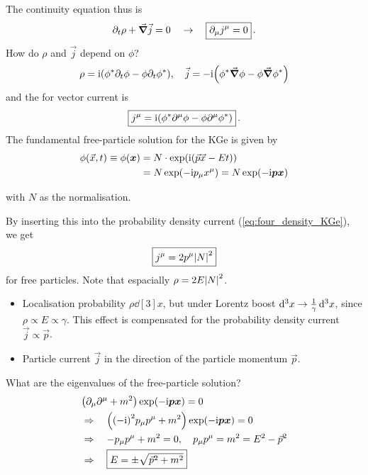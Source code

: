 The continuity equation thus is
\begin{align}
    \partial_t \rho + \vec \grad \vec j = 0 \quad \rightarrow \quad \boxed{\partial_\mu j^\mu = 0}\,.
\end{align}
How do $\rho$ and $\vec j$ depend on $\phi$?
\begin{align}\label{eq:four_density_KGe}
    \rho = \mathrm{i} \qty(\phi^*\partial_t \phi - \phi \partial_t \phi^*), \quad \vec j = - \mathrm{i} \qty(\phi^* \vec\grad \phi - \phi  \vec \grad \phi^*)
\end{align}
and the for vector current is
\begin{align}
    \boxed{j^\mu = \mathrm{i} \qty(\phi^* \partial^\mu \phi - \phi\partial^\mu \phi^*)}\,.
\end{align}
The fundamental free-particle solution for the KGe is given by
\begin{align}\begin{split}
    \phi \qty(\vec x,t) \equiv \phi ({\bm{x}}) & = N \cdot \exp(\mathrm{i} \qty(\vec p\vec x - Et))\\
    & = N \exp(- \mathrm{i} p_\mu x^\mu) = N \exp(-\mathrm{i} {\bm{p}}{\bm{x}})
\end{split}\end{align}
\begin{compactitem}
    \item[with] $N$ as the normalisation.
\end{compactitem}
By inserting this into the probability density current (\cref{eq:four_density_KGe}), we get
\begin{align}
    \boxed{j^\mu = 2 p^\mu \qty|N|^2}
\end{align}
for free particles. Note that espacially $\rho = 2 E \qty|N|^2$.
\begin{itemize}[$\ra$]
    \item Localisation probability $\rho \dd[3]{x}$, but under Lorentz boost $\dd[3]{x} \rightarrow \frac 1\gamma \dd[3]{x}$, since $\rho \propto E \propto \gamma$. This effect is compensated for the probability density current $\vec j \propto \vec p$.
    \item Particle current $\vec j$ in the direction of the particle momentum $\vec p$.
\end{itemize}
What are the eigenvalues of the free-particle solution?
\begin{align}
    &\qty(\partial_\mu \partial^\mu + m^2) \exp(-\mathrm{i} {\bm{p}}{\bm{x}}) = 0 \nonumber \\
    &\Rightarrow\quad \qty(\qty(-\mathrm{i})^2 p_\mu p^\mu + m^2) \exp(-\mathrm{i} {\bm{p}} {\bm{x}}) = 0 \nonumber \\
    &\Rightarrow\quad - p_\mu p^\mu + m^2 = 0, \quad p_\mu p^\mu = m^2 = E^2 - \vec p^2 \nonumber \\
    &\Rightarrow\quad \boxed{E = \pm \sqrt{\vec p^2 + m^2}}
\end{align}
